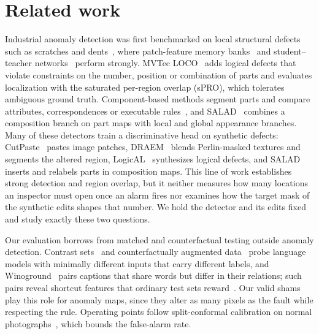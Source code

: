 \section{Related work}
\label{sec:related}
Industrial anomaly detection was first benchmarked on local structural defects such as scratches and dents~\cite{bergmann2019mvtec}, where patch-feature memory banks~\cite{roth2022patchcore} and student--teacher networks~\cite{batzner2024} perform strongly. MVTec LOCO~\cite{bergmann2022} adds logical defects that violate constraints on the number, position or combination of parts and evaluates localization with the saturated per-region overlap (sPRO), which tolerates ambiguous ground truth. Component-based methods segment parts and compare attributes, correspondences or executable rules~\cite{liu2023,peng2025,zhang2026logico,ji2026}, and SALAD~\cite{fucka2025} combines a composition branch on part maps with local and global appearance branches. Many of these detectors train a discriminative head on synthetic defects: CutPaste~\cite{li2021cutpaste} pastes image patches, DRAEM~\cite{zavrtanik2021draem} blends Perlin-masked textures and segments the altered region, LogicAL~\cite{zhao2024} synthesizes logical defects, and SALAD inserts and relabels parts in composition maps. This line of work establishes strong detection and region overlap, but it neither measures how many locations an inspector must open once an alarm fires nor examines how the target mask of the synthetic edits shapes that number. We hold the detector and its edits fixed and study exactly these two questions.

Our evaluation borrows from matched and counterfactual testing outside anomaly detection. Contrast sets~\cite{gardner2020contrast} and counterfactually augmented data~\cite{kaushik2020learning} probe language models with minimally different inputs that carry different labels, and Winoground~\cite{thrush2022} pairs captions that share words but differ in their relations; such pairs reveal shortcut features that ordinary test sets reward~\cite{geirhos2020shortcut}. Our valid shams play this role for anomaly maps, since they alter as many pixels as the fault while respecting the rule. Operating points follow split-conformal calibration on normal photographs~\cite{bates2023,angelopoulos2023gentle}, which bounds the false-alarm rate.
